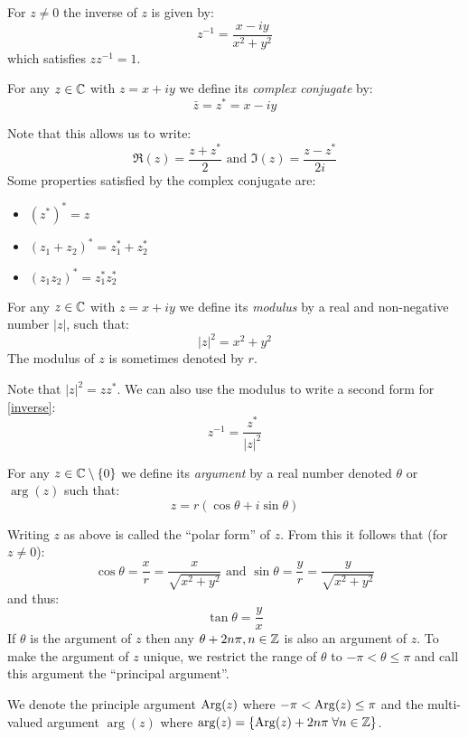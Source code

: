 \documentclass[../main.tex]{subfiles}
\begin{document}
For $z \neq 0$ the inverse of $z$ is given by:
\begin{equation}
  z^{-1} = \frac{x - iy}{x^2 + y^2}
  \label{inverse}
\end{equation}
which satisfies $zz^{-1} = 1$.
\begin{definition}
  For any $z \in \mathbb{C}$ with $z = x + iy$ we define its \textit{complex conjugate} by:
  \[
    \bar{z} = z^{*} = x - iy
  \]
\end{definition}
Note that this allows us to write:
\[
  \Re(z) = \frac{z + z^{*}}{2} \text{ and }
  \Im(z) = \frac{z - z^{*}}{2i}
\]
Some properties satisfied by the complex conjugate are:
\begin{itemize}
  \item $(z^{*})^{*} = z$
  \item $(z_1 + z_2)^{*} = z^{*}_{1} + z^{*}_{2}$
  \item $(z_1 z_2)^{*} = z^{*}_{1} z^{*}_{2}$
\end{itemize}
\begin{definition}
  For any $z \in \mathbb{C}$ with $z = x + iy$ we define its \textit{modulus} by a real and non-negative number $|z|$, such that:
  \[
    |z|^2 = x^2 + y^2
  \]
  The modulus of $z$ is sometimes denoted by $r$.
\end{definition}
Note that $|z|^2 = z z^{*}$.
We can also use the modulus to write a second form for \cref{inverse}:
\[
  z^{-1} = \frac{z^{*}}{|z|^2}
\]
\begin{definition}
  For any $z \in \mathbb{C} \setminus \{0\}$ we define its \textit{argument} by a real number denoted $\theta$ or $\arg(z)$ such that:
  \[
    z = r(\cos \theta + i \sin \theta)
  \]
\end{definition}
Writing $z$ as above is called the ``polar form'' of $z$.
From this it follows that (for $z \neq 0$):
\[
  \cos \theta = \frac{x}{r} = \frac{x}{\sqrt{x^2 + y^2}}\text{ and }\sin \theta = \frac{y}{r} = \frac{y}{\sqrt{x^2 + y^2}}
\]
and thus:
\[
  \tan \theta = \frac{y}{x}
\]
If $\theta$ is the argument of $z$ then any $\theta + 2n\pi, n \in \mathbb{Z}$ is also an argument of $z$.
To make the argument of $z$ unique, we restrict the range of $\theta$ to $-\pi < \theta \leq \pi$ and call this argument the ``principal argument''.

\begin{remark}[Notation]
  We denote the principle argument $\operatorname{Arg}(z)$ where $-\pi < \operatorname{Arg}(z) \leq \pi$ and the multi-valued argument $\arg(z)$ where $\arg(z) = \{\operatorname{Arg}(z) + 2n\pi\;\forall n \in \mathbb{Z}\}$. 
\end{remark}
\end{document}
